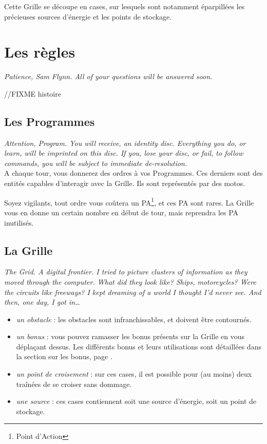 Cette Grille se découpe en cases, sur lesquels sont notamment
éparpillées les précieuses sources d'énergie et les points de stockage.

\newpage
\section{Les règles}
\emph{Patience, Sam Flynn. All of your questions will be answered soon.}

//FIXME histoire

        \subsection{Les Programmes}
        \emph{Attention, Program. You will receive, an identity disc. Everything you do, or learn, will be imprinted on this disc. If you, lose your disc, or fail, to follow commands, you will be subject to immediate de-resolution.}\\

A chaque tour, vous donnerez des ordres à vos Programmes. Ces derniers
sont des entités capables d'interagir avec la Grille. Ils sont
représentés par des motos.

Soyez vigilants, tout ordre vous coûtera un PA\footnote{Point
  d'Action}, et ces PA sont rares. La Grille vous en donne un certain
nombre en début de tour, mais reprendra les PA inutilisés.

\subsection{La Grille}
        \emph{The Grid. A digital frontier. I tried to picture clusters
          of information as they moved through the computer. What did they
          look like? Ships, motorcycles? Were the circuits like freeways? I
          kept dreaming of a world I thought I'd never see. And then, one
          day, I got in\ldots{}}\\



\begin{itemize}
  \item \emph{un obstacle} : les obstacles sont infranchissables,
    et doivent être contournés.
  \item \emph{un bonus} : vous pouvez ramasser les bonus présents
    sur la Grille en vous déplaçant dessus. Les différents bonus et
    leurs utilisations sont détaillées dans la section sur les
    bonus, page \pageref{section-bonus}.
  \item \emph{un point de croisement} : sur ces cases, il est
    possible pour (au moins) deux traînées de se croiser sans dommage.
  \item \emph{une source} : ces cases contiennent soit une
    source d'énergie, soit un point de stockage.
\end{itemize}



